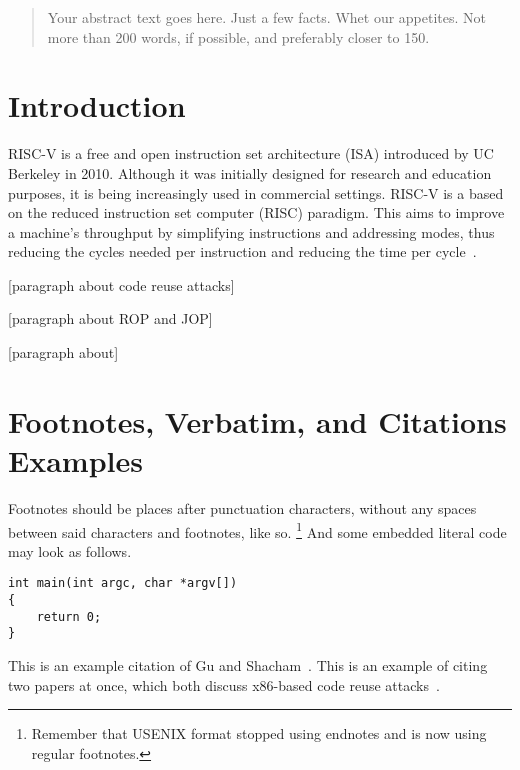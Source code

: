 \begin{abstract}
Your abstract text goes here. Just a few facts. Whet our appetites.
Not more than 200 words, if possible, and preferably closer to 150.
\end{abstract}


\section{Introduction}

RISC-V is a free and open instruction set architecture (ISA) introduced by UC
Berkeley in 2010. Although it was initially designed for research and education
purposes, it is being increasingly used in commercial settings. RISC-V is a
based on the reduced instruction set computer (RISC) paradigm. This aims to
improve a machine's throughput by simplifying instructions and addressing modes,
thus reducing the cycles needed per instruction and reducing the time per cycle~\cite{patterson98risc}.

[paragraph about code reuse attacks]

[paragraph about ROP and JOP]

[paragraph about]

\section{Footnotes, Verbatim, and Citations Examples}

Footnotes should be places after punctuation characters, without any
spaces between said characters and footnotes, like so.%
\footnote{Remember that USENIX format stopped using endnotes and is
  now using regular footnotes.} And some embedded literal code may
look as follows.

\begin{verbatim}
int main(int argc, char *argv[]) 
{
    return 0;
}
\end{verbatim}

This is an example citation of Gu and Shacham~\cite{gu20ropriscv}. This is an
example of citing two papers at once, which both discuss x86-based code reuse
attacks~\cite{shacham07ropx86,bletsch11jopx86}.

